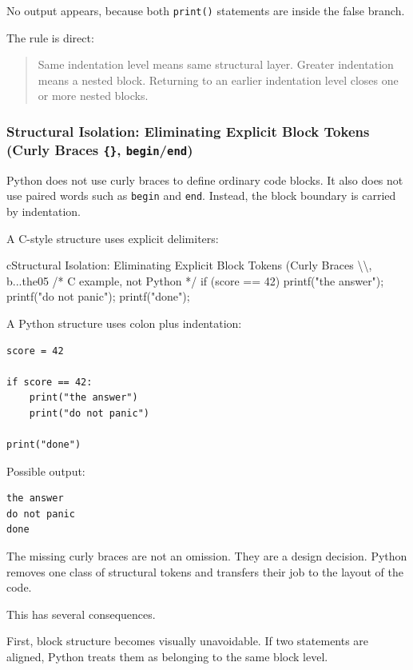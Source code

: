 No output appears, because both \texttt{print()} statements are inside the false branch.

The rule is direct:

\begin{quote}
Same indentation level means same structural layer. Greater indentation means a nested block. Returning to an earlier indentation level closes one or more nested blocks.
\end{quote}

\subsubsection{Structural Isolation: Eliminating Explicit Block Tokens (Curly Braces \texttt{\{\}}, \texttt{begin}/\texttt{end})}

Python does not use curly braces to define ordinary code blocks. It also does not use paired words such as \texttt{begin} and \texttt{end}. Instead, the block boundary is carried by indentation.

A C-style structure uses explicit delimiters:

\begin{codebox}[]{c}{Structural Isolation: Eliminating Explicit Block Tokens (Curly Braces \textbackslash{}{\textbackslash{}}, b...}{the05}
/* C example, not Python */
if (score == 42) {
    printf("the answer\n");
    printf("do not panic\n");
}
printf("done\n");
\end{codebox}


A Python structure uses colon plus indentation:

\begin{verbatim}
score = 42

if score == 42:
    print("the answer")
    print("do not panic")

print("done")
\end{verbatim}

Possible output:

\begin{verbatim}
the answer
do not panic
done
\end{verbatim}

The missing curly braces are not an omission. They are a design decision. Python removes one class of structural tokens and transfers their job to the layout of the code.

This has several consequences.

First, block structure becomes visually unavoidable. If two statements are aligned, Python treats them as belonging to the same block level.

